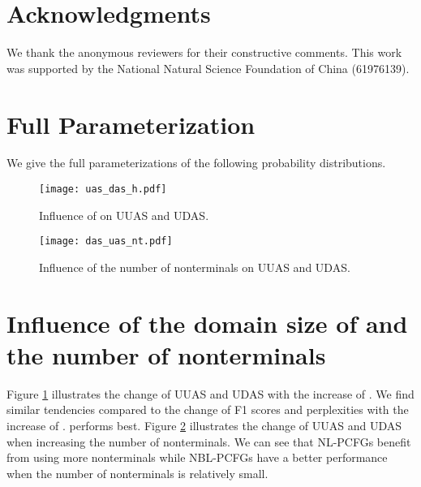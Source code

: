 \documentclass[11pt,a4paper]{article}
\begin{document}
\section*{Acknowledgments}
We thank the anonymous reviewers for their constructive comments. This work was supported by the National Natural Science Foundation of China (61976139).






\appendix
\section{Full Parameterization}
We give the full parameterizations of the following probability distributions.






\begin{figure}[tb!]
	\centering
	\texttt{[image: uas\_das\_h.pdf]}
	\caption{Influence of  on  UUAS and UDAS. }
	\label{fig:das_h}
\end{figure}
\begin{figure}[tb!]
	\centering
	\texttt{[image: das\_uas\_nt.pdf]}
	\caption{Influence of the number of nonterminals on UUAS and UDAS.}
	\label{fig:das_nt}
\end{figure}

\section{Influence of the domain size of  and the number of nonterminals }
Figure \ref{fig:das_h} illustrates the change of UUAS and UDAS with the increase of . We find similar tendencies compared to the change of F1 scores and perplexities with the increase of .  performs best. Figure \ref{fig:das_nt} illustrates the change of UUAS and UDAS when increasing the number of nonterminals. We can see that NL-PCFGs benefit from using more nonterminals while NBL-PCFGs have a better performance when the number of nonterminals is relatively small. 
\end{document}
